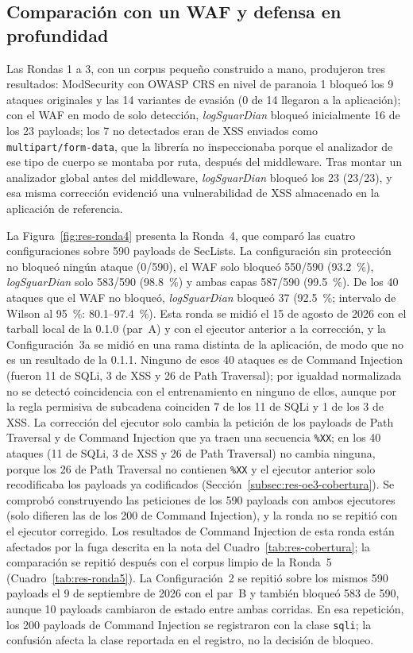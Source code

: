 \subsection{Comparación con un WAF y defensa en profundidad}

Las Rondas 1 a 3, con un corpus pequeño construido a mano, produjeron tres resultados: ModSecurity
con OWASP CRS en nivel de paranoia 1 bloqueó los 9 ataques originales y las 14 variantes de evasión
(0 de 14 llegaron a la aplicación); con el WAF en modo de solo detección, \textit{logSguarDian} bloqueó inicialmente 16 de los 23
payloads; los 7 no detectados eran de XSS enviados como \texttt{multipart/form-data}, que la
librería no inspeccionaba porque el analizador de ese tipo de cuerpo se montaba por ruta, después
del middleware. Tras montar un analizador global antes del middleware, \textit{logSguarDian}
bloqueó los 23 (23/23), y esa misma corrección evidenció una vulnerabilidad de XSS almacenado en la
aplicación de referencia.

La Figura~\ref{fig:res-ronda4} presenta la Ronda~4, que comparó las cuatro configuraciones sobre
590 payloads de SecLists. La configuración sin protección no bloqueó ningún ataque (0/590), el WAF
solo bloqueó 550/590 (93.2~\%), \textit{logSguarDian} solo 583/590 (98.8~\%) y ambas capas 587/590
(99.5~\%). De los 40 ataques que el WAF no bloqueó, \textit{logSguarDian} bloqueó 37 (92.5~\%;
intervalo de Wilson al 95~\%: 80.1--97.4~\%). Esta ronda se midió el 15 de agosto de 2026 con el
tarball local de la 0.1.0 (par~A) y con el ejecutor anterior a la corrección, y la Configuración~3a se midió
en una rama distinta de la aplicación, de modo que no es un resultado de la 0.1.1. Ninguno de esos 40 ataques es de Command Injection (fueron 11 de SQLi, 3 de
XSS y 26 de Path Traversal); por igualdad normalizada no se detectó coincidencia con el
entrenamiento en ninguno de ellos, aunque por la regla permisiva de subcadena coinciden 7 de los 11
de SQLi y 1 de los 3 de XSS. La corrección del ejecutor solo cambia la petición de los payloads de Path
Traversal y de Command Injection que ya traen una secuencia \texttt{\%XX}; en los 40 ataques (11 de
SQLi, 3 de XSS y 26 de Path Traversal) no cambia ninguna, porque los 26 de Path Traversal no
contienen \texttt{\%XX} y el ejecutor anterior solo recodificaba los payloads ya codificados
(Sección~\ref{subsec:res-oe3-cobertura}). Se comprobó construyendo las peticiones de los 590
payloads con ambos ejecutores (solo difieren las de los 200 de Command Injection), y la ronda no se
repitió con el ejecutor corregido. Los resultados
de Command Injection de esta ronda están afectados por la fuga descrita en la nota del
Cuadro~\ref{tab:res-cobertura}; la comparación se repitió después con el corpus limpio de la Ronda~5 (Cuadro~\ref{tab:res-ronda5}). La
Configuración~2 se repitió sobre los mismos 590 payloads el 9 de septiembre de 2026 con el par~B y
también bloqueó 583 de 590, aunque 10 payloads cambiaron de estado entre ambas corridas. En esa
repetición, los 200 payloads de Command Injection se registraron con la clase \texttt{sqli}; la
confusión afecta la clase reportada en el registro, no la decisión de bloqueo.


